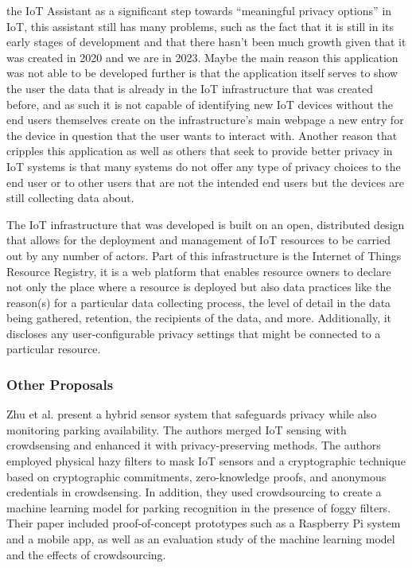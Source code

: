 the IoT Assistant as a significant step towards ``meaningful privacy options''
in IoT, this assistant still has many problems, such as the fact that it
is still in its early stages of development and that there hasn't been much
growth given that it was created in 2020 and we are in 2023. Maybe the main
reason this application was not able to be developed further is that the
application itself serves to show the user the data that is already in the
IoT infrastructure that was created before, and as such it is not capable
of identifying new IoT devices without the end users themselves create on
the infrastructure's main webpage \cite{DasPersonalized} a new entry for
the device in question that the user wants to interact with. Another reason
that cripples this application as well as others that seek to provide better
privacy in IoT systems is that many systems do not offer any type of privacy
choices to the end user or to other users that are not the intended end
users but the devices are still collecting data about.

The IoT infrastructure that was developed \cite{DasPersonalized} is built
on an open, distributed design that allows for the deployment and management
of IoT resources to be carried out by any number of actors. Part of this
infrastructure is the Internet of Things Resource Registry, it is a web
platform that enables resource owners to declare not only the place where
a resource is deployed but also data practices like the reason(s) for a
particular data collecting process, the level of detail in the data being
gathered, retention, the recipients of the data, and more. Additionally,
it discloses any user-configurable privacy settings that might be connected
to a particular resource.

\subsubsection{Other Proposals}

Zhu et al. \cite{ZhuIntegrating} present a hybrid sensor system that safeguards
privacy while also monitoring parking availability. The authors merged IoT
sensing with crowdsensing and enhanced it with privacy-preserving methods.
The authors employed physical hazy filters to mask IoT sensors
and a cryptographic technique based on cryptographic commitments, zero-knowledge
proofs, and anonymous credentials in crowdsensing. In addition, they used
crowdsourcing to create a machine learning model for parking recognition
in the presence of foggy filters. Their paper included proof-of-concept
prototypes such as a Raspberry Pi system and a mobile app, as well as an
evaluation study of the machine learning model and the effects of crowdsourcing.

